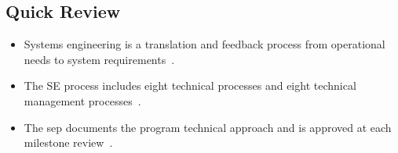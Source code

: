 \documentclass[../main.tex]{subfiles}
\begin{document}
\subsection{Quick Review}
\begin{itemize}
  \item Systems engineering is a translation and feedback process from operational needs to system requirements~\autocite{edo-3-5-1-systems-engineering-overview-2025}.
  \item The SE process includes eight technical processes and eight technical management processes~\autocite{edo-3-5-1-systems-engineering-overview-2025}.
  \item The \ac{sep} documents the program technical approach and is approved at each milestone review~\autocite{edo-3-5-1-systems-engineering-overview-2025}.
\end{itemize}

\end{document}
